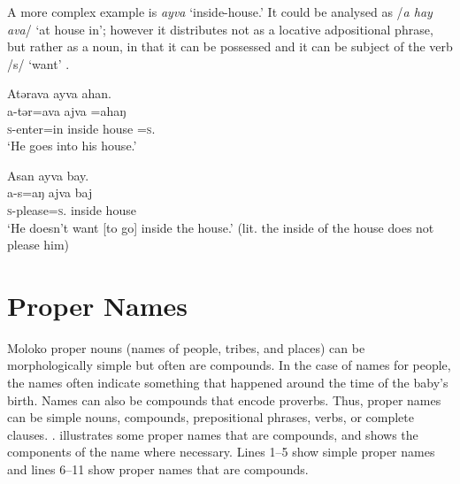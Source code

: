 A more complex example is \textit{ayva} ‘inside-house.’ It could be analysed as /\textit{a hay ava}/ ‘at house in’; however it distributes not as a locative adpositional phrase, but rather as a noun, in that it can be possessed  and it can be subject of the verb /s/\textit{ }‘want’ .

\ea \label{ex:4:25}
Atərava  ayva  ahan.\\
\gll  a-tər=ava   ajva     =ahaŋ\\
      \textsc{s}-enter=in    {inside house}  =\textsc{s}.{\POSS}\\
\glt  ‘He goes into his house.'
\z

\ea \label{ex:4:26}
Asan  ayva  bay.\\
\gll  a-s=aŋ    ajva    baj\\
      \textsc{s}-please=\textsc{s}.{\IO}  {inside house}  {\NEG}\\
\glt  ‘He doesn’t want [to go] inside the house.' (lit. the inside of the house does not please him)
\z

\section{Proper Names}\label{sec:4.4}
\hypertarget{RefHeading1211541525720847}{}
Moloko proper nouns (names of people, tribes, and places) can be morphologically simple but often are compounds. In the case of names for people, the names often indicate something that happened around the time of the baby’s birth.  Names can also be compounds that encode proverbs. Thus, proper names can be simple nouns, compounds, prepositional phrases, verbs, or complete clauses.  . illustrates some proper names that are compounds, and shows the components of the name where necessary. Lines 1--5 show simple proper names and lines 6--11 show proper names that are compounds. 

